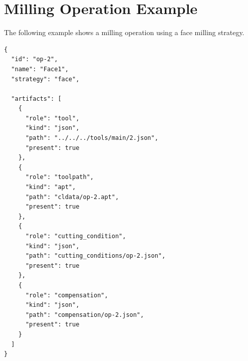\section{Milling Operation Example}

The following example shows a milling operation using a face milling strategy.

\begin{verbatim}
{
  "id": "op-2",
  "name": "Face1",
  "strategy": "face",

  "artifacts": [
    {
      "role": "tool",
      "kind": "json",
      "path": "../../../tools/main/2.json",
      "present": true
    },
    {
      "role": "toolpath",
      "kind": "apt",
      "path": "cldata/op-2.apt",
      "present": true
    },
    {
      "role": "cutting_condition",
      "kind": "json",
      "path": "cutting_conditions/op-2.json",
      "present": true
    },
    {
      "role": "compensation",
      "kind": "json",
      "path": "compensation/op-2.json",
      "present": true
    }
  ]
}
\end{verbatim}
